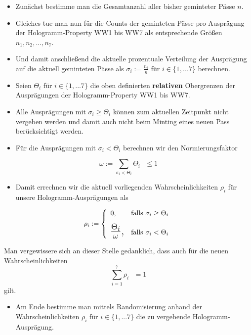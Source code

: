\begin{Algo}

\begin{itemize}
    \item Zunächst bestimme man die Gesamtanzahl aller bisher geminteter Pässe $n$.
    \item Gleiches tue man nun für die Counts der geminteten Pässe pro Ausprägung der Hologramm-Property WW1 bis WW7 als entsprechende Größen $n_1, n_2,...,n_7$.
    \item Und damit anschließend die aktuelle prozentuale Verteilung der Ausprägung auf die aktuell geminteten Pässe als $\sigma_i:= \frac{n_i}{n}$ für $i \in \lbrace 1,...7 \rbrace$ berechnen.
    \item Seien $\Theta_i$ für $i \in \lbrace 1,...7 \rbrace$ die oben definierten \textbf{relativen} Obergrenzen der \newline Ausprägungen der Hologramm-Property WW1 bis WW7.
    \item Alle Ausprägungen mit $\sigma_i \geq \Theta_i$ können zum aktuellen Zeitpunkt nicht vergeben werden und damit auch nicht beim Minting eines neuen Pass berücksichtigt werden.
    \item Für die Ausprägungen mit $\sigma_i < \Theta_i$ berechnen wir den Normierungsfaktor
\end{itemize} 

\begin{equation*}
\omega := \sum_{\sigma_i < \Theta_i} \Theta_i \textrm{ } \leq 1
\end{equation*} 

\begin{itemize}
    \item Damit errechnen wir die aktuell vorliegenden Wahrscheinlichkeiten $\rho_i$ für unsere Hologramm-Ausprägungen als
\end{itemize} 

\[
\rho_i:=\left\{%
\begin{array}{ll}
    0, & \hbox{falls $\sigma_i \geq \Theta_i$} \\[0,3cm]
    \hbox{\LARGE $\frac{\Theta_i}{\omega}$,} & \hbox{falls $\sigma_i < \Theta_i$} \\
\end{array}%
\right.
\] 

Man vergewissere sich an dieser Stelle gedanklich, dass auch für die neuen \newline Wahrscheinlichkeiten \[\sum_{i = 1}^7 \rho_i \textrm{ } = 1\] gilt.

\begin{itemize}
    \item Am Ende bestimme man mittels Randomisierung anhand der Wahrscheinlichkeiten $\rho_i$ für $i \in \lbrace 1,...7 \rbrace$ die zu vergebende Hologramm-Ausprägung. 
\end{itemize}

\end{Algo}


